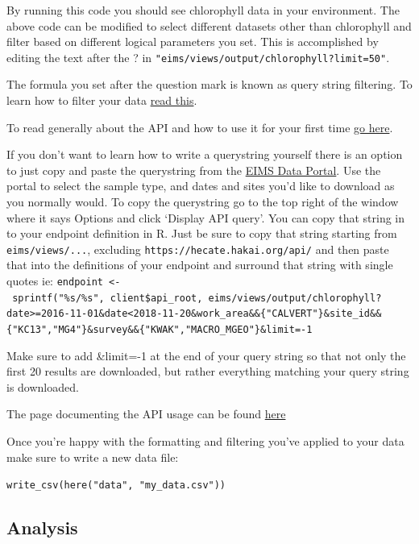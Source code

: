 \documentclass[]{book}
\begin{document}
By running this code you should see chlorophyll data in your
environment. The above code can be modified to select different datasets
other than chlorophyll and filter based on different logical parameters
you set. This is accomplished by editing the text after the ? in
\texttt{"eims/views/output/chlorophyll?limit=50"}.

The formula you set after the question mark is known as query string
filtering. To learn how to filter your data
\href{https://github.com/HakaiInstitute/hakai-api/blob/master/docs/querying-data.md}{read
this}.

To read generally about the API and how to use it for your first time
\href{https://github.com/HakaiInstitute/hakai-api/blob/master/docs/simplified-api-documentation.md\#what-is-the-hakai-api}{go
here}.

If you don't want to learn how to write a querystring yourself there is
an option to just copy and paste the querystring from the
\href{https://hecate.hakai.org/portal2/}{EIMS Data Portal}. Use the
portal to select the sample type, and dates and sites you'd like to
download as you normally would. To copy the querystring go to the top
right of the window where it says Options and click `Display API query'.
You can copy that string in to your endpoint definition in R. Just be
sure to copy that string starting from \texttt{eims/views/...},
excluding \texttt{https://hecate.hakai.org/api/} and then paste that
into the definitions of your endpoint and surround that string with
single quotes ie:
\texttt{endpoint\ \textless{}-\ sprintf("\%s/\%s",\ client\$api\_root,\ \textquotesingle{}eims/views/output/chlorophyll?date\textgreater{}=2016-11-01\&date\textless{}2018-11-20\&work\_area\&\&\{"CALVERT"\}\&site\_id\&\&\{"KC13","MG4"\}\&survey\&\&\{"KWAK","MACRO\_MGEO"\}\&limit=-1\textquotesingle{}}

Make sure to add \&limit=-1 at the end of your query string so that not
only the first 20 results are downloaded, but rather everything matching
your query string is downloaded.

The page documenting the API usage can be found
\href{https://hakaiinstitute.github.io/hakai-api/}{here}

Once you're happy with the formatting and filtering you've applied to
your data make sure to write a new data file:

\texttt{write\_csv(here("data",\ "my\_data.csv"))}

\subsection{Analysis}\label{analysis}
\end{document}
